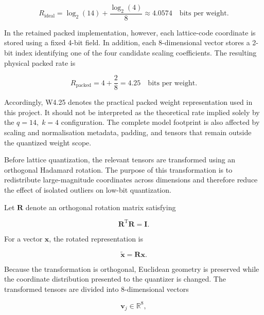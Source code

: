 \begin{equation}
R_{\mathrm{ideal}}
=
\log_{2}(14)
+
\frac{\log_{2}(4)}{8}
\approx
4.0574
\quad
\text{bits per weight}.
\label{eq:nestquant-ideal-rate}
\end{equation}

In the retained packed implementation, however, each lattice-code
coordinate is stored using a fixed 4-bit field. In addition, each
8-dimensional vector stores a 2-bit index identifying one of the four
candidate scaling coefficients. The resulting physical packed rate is

\begin{equation}
R_{\mathrm{packed}}
=
4
+
\frac{2}{8}
=
4.25
\quad
\text{bits per weight}.
\label{eq:nestquant-packed-rate}
\end{equation}

Accordingly, W4.25 denotes the practical packed weight representation
used in this project. It should not be interpreted as the theoretical
rate implied solely by the \(q=14,\;k=4\) configuration. The complete
model footprint is also affected by scaling and normalisation metadata,
padding, and tensors that remain outside the quantized weight scope.

Before lattice quantization, the relevant tensors are transformed using
an orthogonal Hadamard rotation. The purpose of this transformation is
to redistribute large-magnitude coordinates across dimensions and
therefore reduce the effect of isolated outliers on low-bit
quantization.

Let \(\mathbf{R}\) denote an orthogonal rotation matrix satisfying

\begin{equation}
\mathbf{R}^{\mathrm{T}}\mathbf{R}
=
\mathbf{I}.
\label{eq:nestquant-orthogonal}
\end{equation}

For a vector \(\mathbf{x}\), the rotated representation is

\begin{equation}
\widetilde{\mathbf{x}}
=
\mathbf{R}\mathbf{x}.
\label{eq:nestquant-rotation}
\end{equation}

Because the transformation is orthogonal, Euclidean geometry is
preserved while the coordinate distribution presented to the
quantizer is changed. The transformed tensors are divided into 8-dimensional vectors

\begin{equation}
\mathbf{v}_j \in \mathbb{R}^{8},
\label{eq:nestquant-vector-block}
\end{equation}


